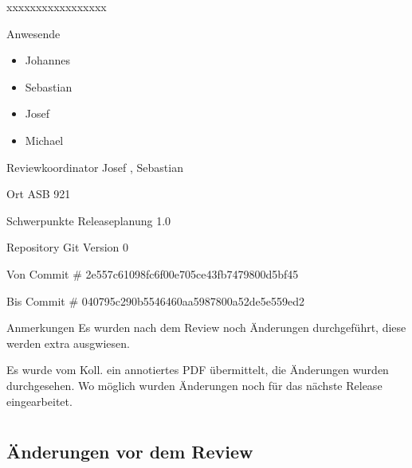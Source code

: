 \documentclass[
ngerman,
paper=a4,
asymmetric,
fontsize=10pt,
headings=small,
draft=false,
numbers=noenddot,
bibtotocnumbered,
footnotes=multiple,
]{scrreprt}
\begin{document}
\begin{labeling}[:]{xxxxxxxxxxxxxxxxx}
  \item[Anwesende] ~
  \begin{itemize}
    \item Johannes 
    \item Sebastian 
    \item Josef 
    \item Michael 
  \end{itemize}
  \item[Reviewkoordinator] Josef , Sebastian 
  \item[Ort] ASB 921
  \item[Schwerpunkte] Releaseplanung 1.0
  \item[Repository] Git Version 0
  \item[Von Commit \#] 2e557c61098fc6f00e705ce43fb7479800d5bf45
  \item[Bis Commit \#] 040795c290b5546460aa5987800a52de5e559ed2
  \item[Anmerkungen] Es wurden nach dem Review noch Änderungen durchgeführt, diese werden extra ausgwiesen.   
  
  Es wurde vom Koll.  ein annotiertes PDF
  übermittelt, die Änderungen wurden durchgesehen. Wo
  möglich wurden Änderungen noch für das nächste Release
  eingearbeitet. 

\end{labeling}
\begin{WidePar}\small
\setcounter{tocdepth}{3}
\tableofcontents
\end{WidePar}





\chapter{\AASS}

\section{Änderungen vor dem Review}
\end{document}
